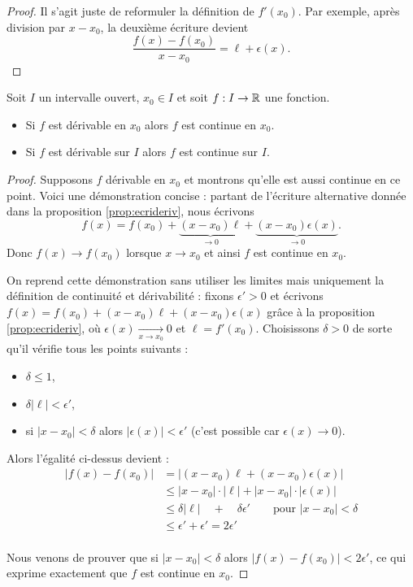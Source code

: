 \documentclass[class=report,crop=false]{standalone}
\begin{document}
\begin{proof}
Il s'agit juste de reformuler la définition de $f'(x_0)$.
Par exemple, après division par $x-x_0$, la deuxième écriture devient
$$\frac{f(x)-f(x_0)}{x-x_0} = \ell + \epsilon(x).$$
\end{proof}

\begin{proposition}
Soit $I$ un intervalle ouvert, $x_0 \in I$ et soit $f : I \to \mathbb{R}$ une fonction.
\begin{itemize}
  \item Si $f$ est dérivable en $x_0$ alors $f$ est continue en $x_0$.
  \item Si $f$ est dérivable sur $I$ alors $f$ est continue sur $I$.
\end{itemize}
\end{proposition}

\begin{proof}
Supposons $f$ dérivable en $x_0$ et montrons qu'elle est aussi continue en ce point.
Voici une démonstration concise : partant de l'écriture alternative donnée dans la proposition \ref{prop:ecrideriv},
nous écrivons
$$f(x)= f(x_0)+\underbrace{(x-x_0) \ell}_{\to 0} + \underbrace{(x-x_0) \epsilon(x)}_{\to 0}.$$
Donc $f(x) \to f(x_0)$ lorsque $x \to x_0$ et ainsi $f$ est continue en $x_0$.

\medskip

On reprend cette démonstration sans utiliser les limites mais uniquement la définition
de continuité et dérivabilité :
fixons $\epsilon'>0$ et écrivons $f(x)= f(x_0)+(x-x_0) \ell + (x-x_0) \epsilon(x)$
grâce à la proposition \ref{prop:ecrideriv}, où $\epsilon(x) \xrightarrow[x\to x_0]{} 0$ et $\ell=f'(x_0)$.
Choisissons $\delta > 0$ de sorte qu'il vérifie tous les points suivants :
\begin{itemize}
  \item $\delta  \le 1$,
  \item $\delta |\ell| < \epsilon'$,
  \item si $|x-x_0|< \delta$ alors $|\epsilon(x)| < \epsilon'$ (c'est possible car $\epsilon(x) \to 0$).
\end{itemize}

Alors l'égalité ci-dessus devient :
\begin{align*}
\big|f(x)-f(x_0)\big|
  &= \big| (x-x_0)\ell + (x-x_0)\epsilon(x) \big| \\
  &\le |x-x_0|\cdot |\ell| + |x-x_0| \cdot |\epsilon(x)| \\
  &\le  \delta |\ell| \quad + \quad \delta \epsilon' \qquad \text{pour } |x-x_0| < \delta \\
  &\le  \epsilon' + \epsilon' = 2\epsilon' \\
\end{align*}

Nous venons de prouver que si $|x-x_0| < \delta$ alors $\big|f(x)-f(x_0)\big| < 2\epsilon'$,
ce qui exprime exactement que $f$ est continue en $x_0$.
\end{proof}
\end{document}
